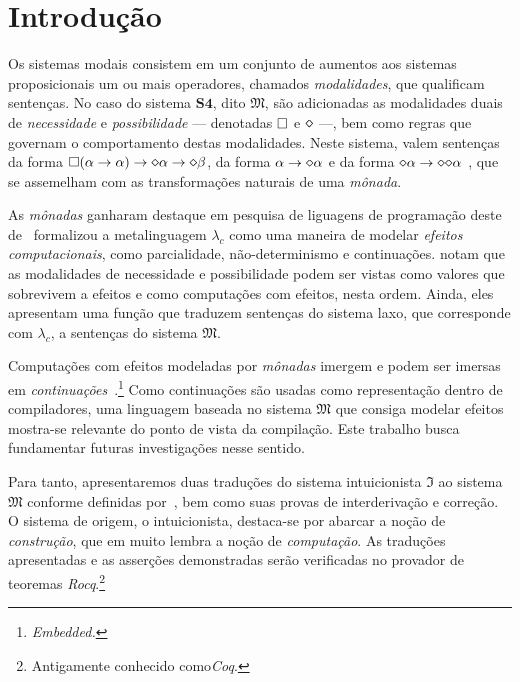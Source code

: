\chapter{Introdução}

    Os sistemas modais consistem em um conjunto de aumentos aos sistemas proposicionais um ou mais operadores, chamados \emph{modalidades}, que qualificam sentenças.
    No caso do sistema $\mathbf{S4}$, dito $\mathfrak{M}$, são adicionadas as modalidades duais de \emph{necessidade} e \emph{possibilidade} --- denotadas $\Box$ e $\pos$ ---, bem como regras que governam o comportamento destas modalidades.
    Neste sistema, valem sentenças da forma $\nec(\alpha\to\alpha)\to\pos\alpha\to\pos\beta$, da forma $\alpha\to\pos\alpha$ e da forma $\pos\alpha\to\pos\pos\alpha$ \citep{Zach+others.2024}, que se assemelham com as transformações naturais de uma \emph{mônada}.

    \vspace{.5\baselineskip}
    As \emph{mônadas} ganharam destaque em pesquisa de liguagens de programação deste de~\cite{Moggi.1991} formalizou a metalinguagem $\lambda_c$ como uma maneira de modelar \emph{efeitos computacionais}, como parcialidade, não-determinismo e continuações.
    \cite{Pfenning+Davies.2001} notam que as modalidades de necessidade e possibilidade podem ser vistas como valores que sobrevivem a efeitos e como computações com efeitos, nesta ordem.
    Ainda, eles apresentam uma função que traduzem sentenças do sistema laxo, que corresponde com $\lambda_c$, a sentenças do sistema $\mathfrak{M}$.

    \vspace{.5\baselineskip}
    Computações com efeitos modeladas por \emph{mônadas} imergem e podem ser imersas em \emph{continuações}~\citep{Filinski.1994}.\footnote{\emph{Embedded.}}
    Como continuações são usadas como representação dentro de compiladores, uma linguagem baseada no sistema $\mathfrak{M}$ que consiga modelar efeitos mostra-se relevante do ponto de vista da compilação.
    Este trabalho busca fundamentar futuras investigações nesse sentido.

    \vspace{.5\baselineskip}
    Para tanto, apresentaremos duas traduções do sistema intuicionista $\mathfrak{I}$ ao sistema $\mathfrak{M}$ conforme definidas por~\cite{Troelstra+Schwichtenberg.2000}, bem como suas provas de interderivação e correção.
    O sistema de origem, o intuicionista, destaca-se por abarcar a noção de \emph{construção}, que em muito lembra a noção de \emph{computação}.
    As traduções apresentadas e as asserções demonstradas serão verificadas no provador de teoremas \emph{Rocq}.\footnote{Antigamente conhecido como\emph{Coq}.}

